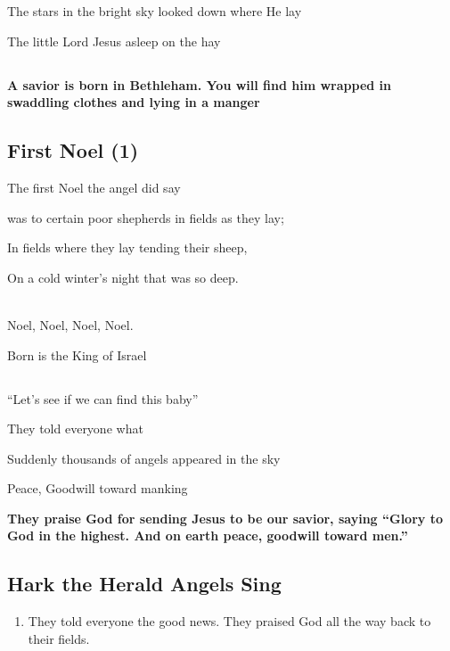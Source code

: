 \documentclass[
  letterpaper,
  DIV=11,
  numbers=noendperiod]{scrartcl}
\providecommand{\tightlist}{%
  \setlength{\itemsep}{0pt}\setlength{\parskip}{0pt}}\usepackage{longtable,booktabs,array}
\begin{document}
The stars in the bright sky looked down where He lay

The little Lord Jesus asleep on the hay

\subsection{}\label{section-1}

\textbf{A savior is born in Bethleham. You will find him wrapped in
swaddling clothes and lying in a manger}

\subsection{First Noel (1)}\label{first-noel-1}

The first Noel the angel did say

was to certain poor shepherds in fields as they lay;

In fields where they lay tending their sheep,

On a cold win­ter's night that was so deep.\\
\strut \\
Noel, Noel, Noel, Noel.

Born is the King of Israel

\subsection{}\label{section-2}

``Let's see if we can find this baby''

They told everyone what

Suddenly thousands of angels appeared in the sky

Peace, Goodwill toward manking

\textbf{They praise God for sending Jesus to be our savior, saying
``Glory to God in the highest. And on earth peace, goodwill toward
men.''}

\subsection{Hark the Herald Angels
Sing}\label{hark-the-herald-angels-sing}

\begin{enumerate}
\def\labelenumi{\arabic{enumi}.}
\setcounter{enumi}{3}
\tightlist
\item
  They told everyone the good news. They praised God all the way back to
  their fields.
\end{enumerate}
\end{document}
